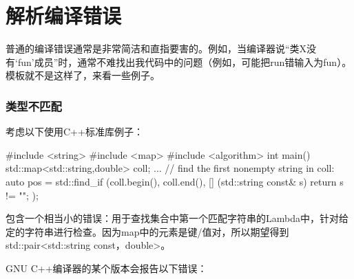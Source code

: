 \section{解析编译错误}
普通的编译错误通常是非常简洁和直指要害的。例如，当编译器说“类X没有‘fun’成员”时，通常不难找出我代码中的问题（例如，可能把run错输入为fun）。模板就不是这样了，来看一些例子。

\subsubsection{类型不匹配}

考虑以下使用C++标准库例子：

\begin{cpp}
#include <string>
#include <map>
#include <algorithm>
int main() {
	std::map<std::string,double> coll;
	...
	// find the first nonempty string in coll:
	auto pos = std::find_if (coll.begin(), coll.end(),
	[] (std::string const& s) {
		return s != "";
	});
}
\end{cpp}

包含一个相当小的错误：用于查找集合中第一个匹配字符串的Lambda中，针对给定的字符串进行检查。因为map中的元素是键/值对，所以期望得到std::pair<std::string const，double>。

GNU C++编译器的某个版本会报告以下错误：

